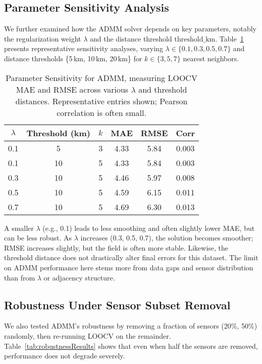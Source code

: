 \documentclass[12pt]{article}                                %
\begin{document}
\subsection{Parameter Sensitivity Analysis}
\label{sec:paramsensitivity}     %

We further examined how the ADMM solver depends on key parameters, notably the regularization 
weight $\lambda$ and the distance threshold $\mathrm{threshold\_km}$. 
Table~\ref{tab:admmSensitivity} presents representative sensitivity analyses, varying 
$\lambda \in \{0.1, 0.3, 0.5, 0.7\}$ and distance thresholds \{5\,km, 10\,km, 20\,km\} 
for $k\in\{3,5,7\}$ nearest neighbors.

\begin{table}[!ht]
\centering
\caption{Parameter Sensitivity for ADMM, measuring LOOCV MAE and RMSE across various 
\(\lambda\) and threshold distances. Representative entries shown; Pearson correlation 
is often small.}
\label{tab:admmSensitivity}
\begin{tabular}{cccccc}
\toprule
\(\lambda\) & Threshold (km) & \(k\) & MAE & RMSE & Corr\\
\midrule
0.1 &  5  & 3 & 4.33 & 5.84 & 0.003 \\
0.1 & 10  & 5 & 4.33 & 5.84 & 0.003 \\
0.3 & 10  & 5 & 4.46 & 5.97 & 0.008 \\
0.5 & 10  & 5 & 4.59 & 6.15 & 0.011 \\
0.7 & 10  & 5 & 4.69 & 6.30 & 0.013 \\
\bottomrule
\end{tabular}
\end{table}

A smaller $\lambda$ (e.g., 0.1) leads to less smoothing and often slightly lower MAE, but can 
be less robust. As $\lambda$ increases (0.3, 0.5, 0.7), the solution becomes smoother; RMSE 
increases slightly, but the field is often more stable. Likewise, the threshold distance 
does not drastically alter final errors for this dataset. The limit on ADMM performance here 
stems more from data gaps and sensor distribution than from $\lambda$ or adjacency structure.

\subsection{Robustness Under Sensor Subset Removal}
\label{sec:robustness}    %

We also tested ADMM’s robustness by removing a fraction of sensors (20\%, 50\%) randomly, 
then re-running LOOCV on the remainder. Table~\ref{tab:robustnessResults} shows that even 
when half the sensors are removed, performance does not degrade severely.
\end{document}
